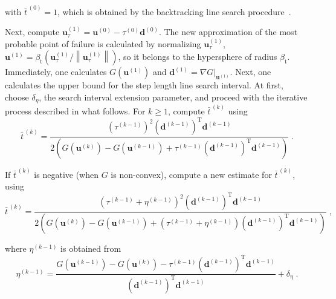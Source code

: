 \documentclass[final,5p,times,twocolumn,numbers]{elsarticle}
\newcommand{\norm}[1]{\left\lVert#1\right\rVert}
\begin{document}
\noindent with $ \bar{t}^{\, \left( 0 \right)} = 1 $, which is obtained by the backtracking line search procedure~\cite{bib:nocedal2006}.

Next, compute $ \mathbf{u}_{\tau}^{\left( 1 \right)} = \mathbf{u}^{\left( 0 \right)} - \tau^{\left( 0 \right)} \mathbf{d}^{\left( 0 \right)} $. The new approximation of the most probable point of failure is calculated by normalizing $ \mathbf{u}_{\tau}^{\left( 1 \right)} $, $ \mathbf{u}^{\left( 1 \right)} = \beta_{\mathrm{t}} \left( \mathbf{u}_{\tau}^{\left( 1 \right)} / \norm{\mathbf{u}_{\tau}^{\left( 1 \right)}} \right) $, so it belongs to the hypersphere of radius $ \beta_{\mathrm{t}} $. Immediately, one calculates $ G \left( \mathbf{u}^{\left( 1 \right)} \right) $ and $ \mathbf{d}^{\left( 1 \right)} = \left. \nabla G \right\rvert_{\mathbf{u}^{\left( 1 \right)}} $. Next, one calculates the upper bound for the step length line search interval. At first, choose $ \delta_{\eta} $, the search interval extension parameter, and proceed with the iterative process described in what follows. For $ k \geq 1 $, compute $ \bar{t}^{\, \left( k \right)} $ using
%
\begin{equation*}
\bar{t}^{\, \left( k \right)} = \dfrac{\left( \tau^{\left( k - 1 \right)} \right)^{2} \left( \mathbf{d}^{\left( k - 1 \right)} \right)^{\mathrm{T}} \mathbf{d}^{\left( k - 1 \right)}}{2 \left( G \left( \mathbf{u}^{\left( k \right)} \right) - G \left( \mathbf{u}^{\left( k - 1 \right)} \right) + \tau^{\left( k - 1 \right)} \left( \mathbf{d}^{\left( k - 1 \right)} \right)^{\mathrm{T}} \mathbf{d}^{\left( k - 1 \right)} \right)} \; .
\end{equation*}

\noindent If $ \bar{t}^{\, \left( k \right)} $ is negative (when $ G $ is non-convex), compute a new estimate for $ \bar{t}^{\, \left( k \right)} $, using
%
\begin{equation*}
\bar{t}^{\, \left( k \right)} = \dfrac{\left( \tau^{\left( k - 1 \right)} + \eta^{\left( k - 1 \right)} \right)^{2} \left( \mathbf{d}^{\left( k - 1 \right)} \right)^{\mathrm{T}} \mathbf{d}^{\left( k - 1 \right)}}{2 \left( G \left( \mathbf{u}^{\left( k \right)} \right) - G \left( \mathbf{u}^{\left( k - 1 \right)} \right) + \left( \tau^{\left( k - 1 \right)} + \eta^{\left( k - 1 \right)} \right) \left( \mathbf{d}^{\left( k - 1 \right)} \right)^{\mathrm{T}} \mathbf{d}^{\left( k - 1 \right)} \right)} \; ,
\end{equation*}

\noindent where $ \eta^{\left( k - 1 \right)} $ is obtained from
%
\begin{equation*}
\eta^{\left( k - 1 \right)} = \dfrac{G \left( \mathbf{u}^{\left( k - 1 \right)} \right) - G \left( \mathbf{u}^{\left( k \right)} \right) - \tau^{\left( k - 1 \right)} \left( \mathbf{d}^{\left( k - 1 \right)} \right)^{\mathrm{T}} \mathbf{d}^{\left( k - 1 \right)}}{\left( \mathbf{d}^{\left( k - 1 \right)} \right)^{\mathrm{T}} \mathbf{d}^{\left( k - 1 \right)}} + \delta_{\eta} \; .
\end{equation*}
\end{document}
